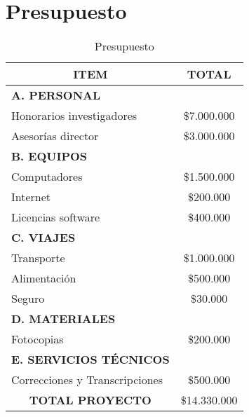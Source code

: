 \pagebreak
\section{Presupuesto}
\begin{table}[htbp]
  \centering
    \begin{tabular}{cc}
    \hline
    \textbf{ITEM} & \textbf{TOTAL} \\
    \hline
    \multicolumn{1}{l}{\textbf{A. PERSONAL}} &  \\
    \multicolumn{1}{l}{Honorarios investigadores} & \$7.000.000 \\
    \multicolumn{1}{l}{Asesor\'{i}as director} & \$3.000.000 \\
    \multicolumn{1}{l}{\textbf{B. EQUIPOS}} &  \\
    \multicolumn{1}{l}{Computadores} & \$1.500.000 \\
    \multicolumn{1}{l}{Internet} & \$200.000 \\
    \multicolumn{1}{l}{Licencias software} & \$400.000 \\
    \multicolumn{1}{l}{\textbf{C. VIAJES}} &  \\
    \multicolumn{1}{l}{Transporte} & \$1.000.000 \\
    \multicolumn{1}{l}{Alimentaci\'{o}n} & \$500.000 \\
    \multicolumn{1}{l}{Seguro} & \$30.000 \\
    \multicolumn{1}{l}{\textbf{D. MATERIALES}} &  \\
    \multicolumn{1}{l}{Fotocopias} & \$200.000 \\
    \multicolumn{1}{l}{\textbf{E. SERVICIOS TÉCNICOS}} &  \\
    \multicolumn{1}{l}{Correcciones y Transcripciones} & \$500.000 \\
    \hline
    \textbf{TOTAL PROYECTO} & \$14.330.000 \\
    \hline
    \end{tabular}%
  \label{tab:addlabel}%
  \caption{Presupuesto}
\end{table}%
